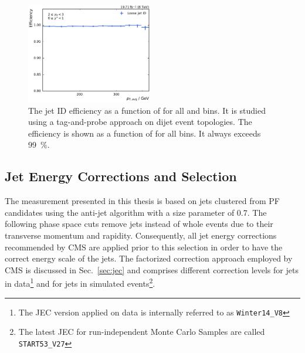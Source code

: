 \begin{figure}[htbp]
    \includegraphics[width=0.49\textwidth]{figures/measurement/jetideff_yb2ys0.pdf}
    \caption[Efficiency of the jet ID]{The jet ID efficiency as a function of
    \ptavg for all \ystar and \yboost bins. It is studied using a
    tag-and-probe approach on dijet event topologies. The efficiency is
    shown as a function of \ptavg for all bins. It always exceeds \SI{99}{\percent}.}
    \label{fig:jetid_eff}
\end{figure}

\subsection{Jet Energy Corrections and Selection}

The measurement presented in this thesis is based on jets clustered from PF
candidates using the anti-\kt jet algorithm with a size parameter of 0.7. The
following phase space cuts remove jets instead of whole events due to their
transverse momentum and rapidity. Consequently, all jet energy corrections
recommended by CMS are applied prior to this selection in order to have the
correct energy scale of the jets. The factorized correction approach employed by
CMS is discussed in Sec.~\ref{sec:jec} and comprises different correction levels
for jets in data\footnote{The JEC version applied on data is internally referred
to as \texttt{Winter14\_V8}} and for jets in simulated events\footnote{The
latest JEC for run-independent Monte Carlo Samples are called
\texttt{START53\_V27}}.

